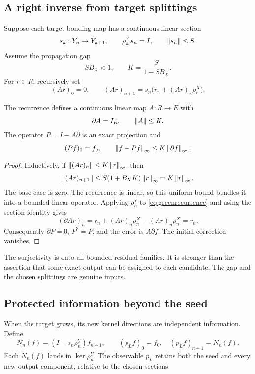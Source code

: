 \subsection{A right inverse from target splittings}
Suppose each target bonding map has a continuous linear section
\[
 s_n:Y_n\to Y_{n+1},\qquad \rho^Y_ns_n=I,\qquad \left\lVert s_n\right\rVert\le S.
\]
Assume the propagation gap
\begin{equation}\label{eq:splitgap}
 SB_X<1,\qquad K=\frac{S}{1-SB_X}.
\end{equation}
For \(r\in R\), recursively set
\begin{equation}\label{eq:greenrecurrence}
 (Ar)_0=0,\qquad
 (Ar)_{n+1}=s_n\bigl(r_n+(Ar)_n\rho^X_n\bigr).
\end{equation}

\begin{theorem}\label{KS20}
The recurrence defines a continuous linear map \(A:R\to E\) with
\[
 \partial A=I_R,\qquad \left\lVert A\right\rVert\le K.
\]
The operator \(P=I-A\partial\) is an exact projection and
\[
 (Pf)_0=f_0,\qquad
 \left\lVert f-Pf\right\rVert_\infty\le K\left\lVert\partial f\right\rVert_\infty.
\]
\end{theorem}
\begin{proof}
Inductively, if \(\left\lVert(Ar)_n\right\rVert\le K\left\lVert r\right\rVert_\infty\), then
\[
 \left\lVert(Ar)_{n+1}\right\rVert
 \le S(1+B_XK)\left\lVert r\right\rVert_\infty=K\left\lVert r\right\rVert_\infty.
\]
The base case is zero. The recurrence is linear, so this uniform bound bundles it into a bounded linear operator. Applying \(\rho^Y_n\) to \eqref{eq:greenrecurrence} and using the section identity gives
\[
 (\partial Ar)_n=r_n+(Ar)_n\rho^X_n-(Ar)_n\rho^X_n=r_n.
\]
Consequently \(\partial P=0\), \(P^2=P\), and the error is \(A\partial f\). The initial correction vanishes.
\end{proof}
The surjectivity is onto all bounded residual families. It is stronger than the assertion that some exact output can be assigned to each candidate. The gap and the chosen splittings are genuine inputs.

\subsection{Protected information beyond the seed}
When the target grows, its new kernel directions are independent information. Define
\[
 N_n(f)=(I-s_n\rho^Y_n)f_{n+1},\qquad
 (p_Lf)_0=f_0,\quad(p_Lf)_{n+1}=N_n(f).
\]
Each \(N_n(f)\) lands in \(\ker\rho^Y_n\). The observable \(p_L\) retains both the seed and every new output component, relative to the chosen sections.

